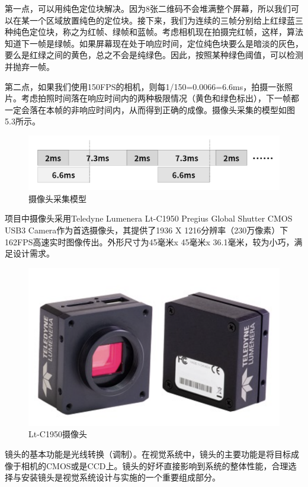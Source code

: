 第一点，可以用纯色定位块解决。因为8张二维码不会堆满整个屏幕，所以我们可以在某一个区域放置纯色的定位块。接下来，我们为连续的三帧分别给上红绿蓝三种纯色定位块，称之为红帧、绿帧和蓝帧。考虑相机现在拍摄完红帧，这样，算法知道下一帧是绿帧。如果屏幕现在处于响应时间，定位纯色块要么是暗淡的灰色，要么是红绿之间的黄色，总之不会是纯绿色。因此，按照某种绿色阈值，可以检测并抛弃一帧。

第二点，如果我们使用150FPS的相机，则每1/150=0.0066=6.6ms，拍摄一张照片。考虑拍照时间落在响应时间内的两种极限情况（黄色和绿色标出），下一帧都一定会落在本帧的非响应时间内，从而得到正确的成像。摄像头采集的模型如图5.3所示。

\begin{figure}[!htbp]
\centering
\includegraphics[scale=0.4]{figures/HW/Cap_Md.png}
\caption{摄像头采集模型}
\end{figure}

项目中摄像头采用Teledyne Lumenera Lt-C1950 Pregius Global Shutter CMOS USB3 Camera作为首选摄像头，其提供了1936 X 1216分辨率（230万像素）下162FPS高速实时图像传出。外形尺寸为45毫米x 45毫米x 36.1毫米，较为小巧，满足设计需求。

\begin{figure}[!htbp]
\centering
\includegraphics[scale=0.6]{figures/HW/LTC1950.png}
\caption{Lt-C1950摄像头}
\end{figure}

镜头的基本功能是光线转换（调制）。在视觉系统中，镜头的主要功能是将目标成像于相机的CMOS或是CCD上。镜头的好坏直接影响到系统的整体性能，合理选择与安装镜头是视觉系统设计与实施的一个重要组成部分。\cite{郑新宇0基于视觉检测的对位贴合系统设计与应用}

